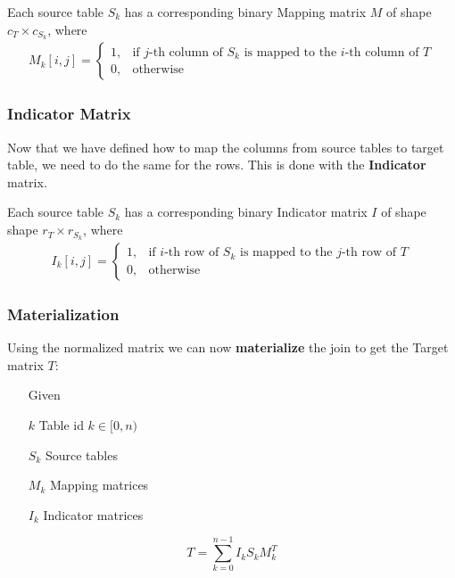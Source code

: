\begin{definition}
    Each source table $S_k$ has a corresponding binary Mapping matrix $M$ of shape $c_T \times c_{S_k}$, where
    \begin{align*}
        M_k[i,j] = \begin{cases}
                       1, & \text{if $j$-th column of $S_k$ is mapped to the $i$-th column of $T$} \\
                       0, & \text{otherwise}
                   \end{cases}
    \end{align*}
\end{definition}


\subsubsection{Indicator Matrix}
Now that we have defined how to map the columns from source tables to target table, we need to do the same for the rows. This is done with the \textbf{Indicator} matrix.

\begin{definition}
    Each source table $S_k$ has a corresponding binary Indicator matrix $I$ of shape shape $r_T \times r_{S_k}$, where
    \begin{align*}
        I_k[i,j] = \begin{cases}
                       1, & \text{if $i$-th row of $S_k$ is mapped to the $j$-th row of $T$} \\
                       0, & \text{otherwise}
                   \end{cases}
    \end{align*}
\end{definition}



\subsubsection{Materialization}
Using the normalized matrix we can now \textbf{materialize} the join to get the Target matrix $T$:

\begin{definition}
    \begin{itemize}
        \item[]
        \item[] Given
        \item[$k$] Table id $k \in [0,n)$
        \item[$S_k$] Source tables
        \item[$M_k$] Mapping matrices
        \item[$I_k$] Indicator matrices
    \end{itemize}
    \[
        T = \sum_{k=0}^{n-1}  I_k S_k M^T_k
    \]

\end{definition}

